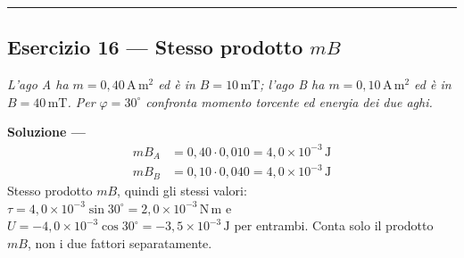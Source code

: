 \documentclass[11pt,a4paper]{scrartcl}
\newenvironment{soluzione}{\par\noindent\textbf{Soluzione ---} }{\par}
\newcommand{\un}[1]{\,\mathrm{#1}}
\begin{document}
\bigskip\hrule\bigskip

\subsection*{Esercizio 16 --- Stesso prodotto $mB$}
\vspace{2mm}

\begin{esercizio}
\emph{L'ago A ha $m=0{,}40\un{A\,m^2}$ ed è in $B=10\un{mT}$; l'ago B ha $m=0{,}10\un{A\,m^2}$ ed è in $B=40\un{mT}$. Per $\varphi=30^\circ$ confronta momento torcente ed energia dei due aghi.}
\end{esercizio}

\begin{soluzione}
\begin{align*}
  mB_A&=0{,}40\cdot0{,}010=4{,}0\times10^{-3}\un{J}\\
  mB_B&=0{,}10\cdot0{,}040=4{,}0\times10^{-3}\un{J}
\end{align*}
Stesso prodotto $mB$, quindi gli stessi valori: $\tau=4{,}0\times10^{-3}\sin30^\circ=2{,}0\times10^{-3}\un{N\,m}$ e $U=-4{,}0\times10^{-3}\cos30^\circ=-3{,}5\times10^{-3}\un{J}$ per entrambi. Conta solo il prodotto $mB$, non i due fattori separatamente.
\end{soluzione}
\end{document}
